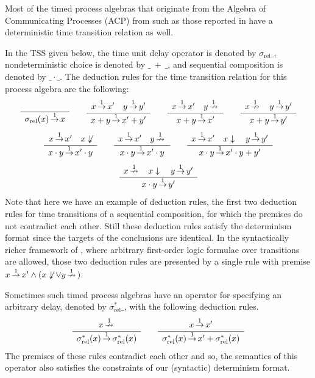 \begin{example}\label{ex:timetrans2}
Most of the timed process algebras that originate from the Algebra of Communicating Processes (ACP) from \cite{Bergstra84,Baeten90} such as those reported in \cite{Baeten02} have a deterministic time transition relation as well.

In the TSS given below, the time unit delay operator is denoted by $\sigma_{\mathrm{rel}} \_$, nondeterministic choice is denoted by $\_~+~\_$,
and sequential composition is denoted by $\_ \cdot \_$.
The deduction rules for the time transition relation for this process algebra are the following:
\[ \sosrule{}{\sigma_{\mathrm{rel}}(x) \trans{1} x}
\qquad
\sosrule{x \trans{1} x' \quad y \trans{1} y'}{x + y \trans{1} x'+y'}
\qquad
\sosrule{x \trans{1} x' \quad y \ntrans{1} }{x + y \trans{1} x'}
\qquad
\sosrule{x \ntrans{1} \quad y \trans{1} y'}{x + y \trans{1} y'}
\]
\[
\sosrule{x \trans{1} x' \quad x \not\downarrow}{x \cdot y \trans{1} x' \cdot y}
\qquad
\sosrule{x \trans{1} x' \quad y \ntrans{1}}{x \cdot y \trans{1} x' \cdot y}
\qquad
\sosrule{x \trans{1} x' \quad x \downarrow \quad y \trans{1} y'}{x \cdot y \trans{1} x' \cdot y + y'}
\]
\[
\sosrule{x \ntrans{1} \quad x \downarrow \quad y \trans{1} y'}{x \cdot y \trans{1} y'}
\]
Note that here we have an example of deduction rules, the first two deduction rules for time transitions of a sequential composition, for which the premises do not contradict each other. Still these deduction rules satisfy the determinism format since the targets of the conclusions are identical. In the syntactically richer framework of \cite{Reniers08}, where arbitrary first-order logic formulae over transitions are allowed, those two deduction rules are presented by a single rule with premise $x \,{\stackrel{{1}}{\rightarrow}}\, x' \land (x \not\downarrow \lor y \,{\stackrel{{1}}{\nrightarrow}}\,)$.

Sometimes such timed process algebras have an operator for specifying an arbitrary delay, denoted by $\sigma^*_{\mathrm{rel}} \_$, with the following deduction rules.
\[ \sosrule{x \ntrans{1}}{\sigma^*_{\mathrm{rel}}(x) \trans{1} \sigma^*_{\mathrm{rel}}(x)}
\qquad
\sosrule{x \trans{1} x'}{\sigma^*_{\mathrm{rel}}(x) \trans{1} x' + \sigma^*_{\mathrm{rel}}(x)}
\]
The premises of these rules contradict each other and so, the semantics of this operator also satisfies the constraints of our (syntactic)
determinism format.
\end{example}
